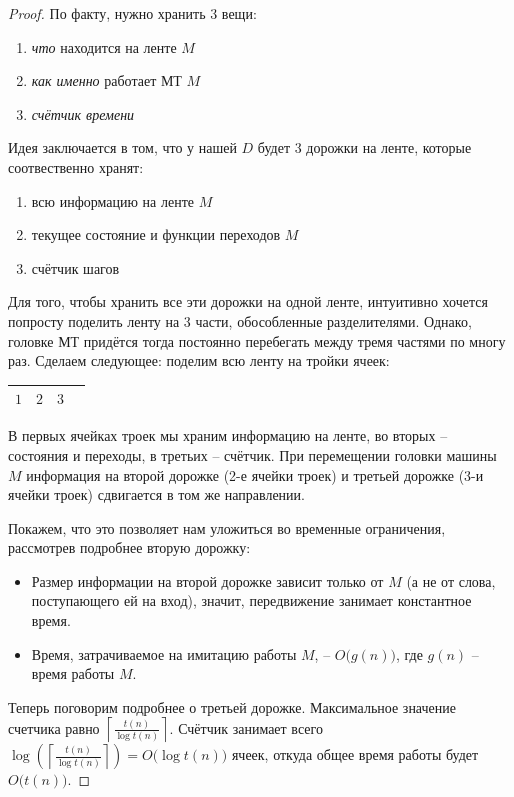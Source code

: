 \documentclass[a4paper,12pt]{article}
\begin{document}
\begin{proof}
    По факту, нужно хранить 3 вещи:
    \begin{enumerate}
        \item \textit{что} находится на ленте $M$
        \item \textit{как именно} работает МТ $M$
        \item \textit{счётчик времени}
    \end{enumerate}
    Идея заключается в том, что у нашей $D$ будет 3 дорожки на ленте, которые соотвественно хранят:
    \begin{enumerate}
        \item всю информацию на ленте $M$
        \item текущее состояние и функции переходов $M$
        \item счётчик шагов
    \end{enumerate}
    Для того, чтобы хранить все эти дорожки на одной ленте, интуитивно хочется попросту поделить ленту на 3 части, обособленные разделителями. Однако, головке МТ придётся тогда постоянно перебегать между тремя частями по многу раз. Сделаем следующее: поделим всю ленту на тройки ячеек:\begin{tabular}{|c|*{3}{r|}|}\hline$1$& $2$ &$3$\\\hline\end{tabular} В первых ячейках троек мы храним информацию на ленте, во вторых -- состояния и переходы, в третьих -- счётчик. При перемещении головки машины $M$ информация на второй дорожке (2-е ячейки троек) и третьей дорожке (3-и ячейки троек) сдвигается в том же направлении. 
    
    Покажем, что это позволяет нам уложиться во временные ограничения, рассмотрев подробнее вторую дорожку:
    \begin{itemize}
        \item Размер информации на второй дорожке зависит только от $M$ (а не от слова, поступающего ей на вход), значит, передвижение занимает константное время.
        \item  Время, затрачиваемое на имитацию работы $M$, -- $O\big(g(n)\big)$, где $g(n)$ -- время работы $M$.
    \end{itemize}
    Теперь поговорим подробнее о третьей дорожке. Максимальное значение счетчика равно $\left\lceil \frac{t(n)}{\log t(n)}\right\rceil$. Счётчик занимает всего $\log\left(\left\lceil \frac{t(n)}{\log t(n)}\right\rceil\right) = O\big(\log t(n)\big)$ ячеек, откуда общее время работы будет $O\big(t(n)\big)$.
    

\end{proof}
\end{document}
